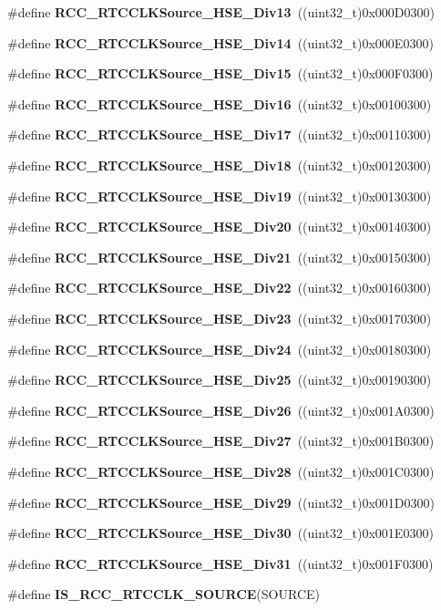 \begin{DoxyCompactItemize}
\item 
\#define \textbf{ R\+C\+C\+\_\+\+R\+T\+C\+C\+L\+K\+Source\+\_\+\+H\+S\+E\+\_\+\+Div13}~((uint32\+\_\+t)0x000\+D0300)
\item 
\#define \textbf{ R\+C\+C\+\_\+\+R\+T\+C\+C\+L\+K\+Source\+\_\+\+H\+S\+E\+\_\+\+Div14}~((uint32\+\_\+t)0x000\+E0300)
\item 
\#define \textbf{ R\+C\+C\+\_\+\+R\+T\+C\+C\+L\+K\+Source\+\_\+\+H\+S\+E\+\_\+\+Div15}~((uint32\+\_\+t)0x000\+F0300)
\item 
\#define \textbf{ R\+C\+C\+\_\+\+R\+T\+C\+C\+L\+K\+Source\+\_\+\+H\+S\+E\+\_\+\+Div16}~((uint32\+\_\+t)0x00100300)
\item 
\#define \textbf{ R\+C\+C\+\_\+\+R\+T\+C\+C\+L\+K\+Source\+\_\+\+H\+S\+E\+\_\+\+Div17}~((uint32\+\_\+t)0x00110300)
\item 
\#define \textbf{ R\+C\+C\+\_\+\+R\+T\+C\+C\+L\+K\+Source\+\_\+\+H\+S\+E\+\_\+\+Div18}~((uint32\+\_\+t)0x00120300)
\item 
\#define \textbf{ R\+C\+C\+\_\+\+R\+T\+C\+C\+L\+K\+Source\+\_\+\+H\+S\+E\+\_\+\+Div19}~((uint32\+\_\+t)0x00130300)
\item 
\#define \textbf{ R\+C\+C\+\_\+\+R\+T\+C\+C\+L\+K\+Source\+\_\+\+H\+S\+E\+\_\+\+Div20}~((uint32\+\_\+t)0x00140300)
\item 
\#define \textbf{ R\+C\+C\+\_\+\+R\+T\+C\+C\+L\+K\+Source\+\_\+\+H\+S\+E\+\_\+\+Div21}~((uint32\+\_\+t)0x00150300)
\item 
\#define \textbf{ R\+C\+C\+\_\+\+R\+T\+C\+C\+L\+K\+Source\+\_\+\+H\+S\+E\+\_\+\+Div22}~((uint32\+\_\+t)0x00160300)
\item 
\#define \textbf{ R\+C\+C\+\_\+\+R\+T\+C\+C\+L\+K\+Source\+\_\+\+H\+S\+E\+\_\+\+Div23}~((uint32\+\_\+t)0x00170300)
\item 
\#define \textbf{ R\+C\+C\+\_\+\+R\+T\+C\+C\+L\+K\+Source\+\_\+\+H\+S\+E\+\_\+\+Div24}~((uint32\+\_\+t)0x00180300)
\item 
\#define \textbf{ R\+C\+C\+\_\+\+R\+T\+C\+C\+L\+K\+Source\+\_\+\+H\+S\+E\+\_\+\+Div25}~((uint32\+\_\+t)0x00190300)
\item 
\#define \textbf{ R\+C\+C\+\_\+\+R\+T\+C\+C\+L\+K\+Source\+\_\+\+H\+S\+E\+\_\+\+Div26}~((uint32\+\_\+t)0x001\+A0300)
\item 
\#define \textbf{ R\+C\+C\+\_\+\+R\+T\+C\+C\+L\+K\+Source\+\_\+\+H\+S\+E\+\_\+\+Div27}~((uint32\+\_\+t)0x001\+B0300)
\item 
\#define \textbf{ R\+C\+C\+\_\+\+R\+T\+C\+C\+L\+K\+Source\+\_\+\+H\+S\+E\+\_\+\+Div28}~((uint32\+\_\+t)0x001\+C0300)
\item 
\#define \textbf{ R\+C\+C\+\_\+\+R\+T\+C\+C\+L\+K\+Source\+\_\+\+H\+S\+E\+\_\+\+Div29}~((uint32\+\_\+t)0x001\+D0300)
\item 
\#define \textbf{ R\+C\+C\+\_\+\+R\+T\+C\+C\+L\+K\+Source\+\_\+\+H\+S\+E\+\_\+\+Div30}~((uint32\+\_\+t)0x001\+E0300)
\item 
\#define \textbf{ R\+C\+C\+\_\+\+R\+T\+C\+C\+L\+K\+Source\+\_\+\+H\+S\+E\+\_\+\+Div31}~((uint32\+\_\+t)0x001\+F0300)
\item 
\#define \textbf{ I\+S\+\_\+\+R\+C\+C\+\_\+\+R\+T\+C\+C\+L\+K\+\_\+\+S\+O\+U\+R\+CE}(S\+O\+U\+R\+CE)
\end{DoxyCompactItemize}


